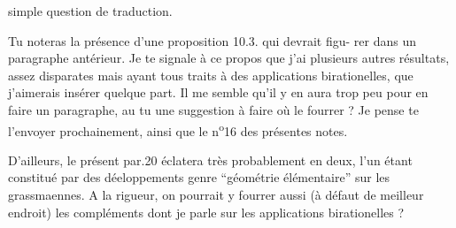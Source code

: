 
simple question de traduction.

Tu noteras la présence d'une proposition 10.3. qui devrait figu-%
rer dans un paragraphe antérieur. Je te signale à ce propos que j'ai
plusieurs autres résultats, assez disparates mais ayant tous traits à
des applications birationelles, que j'aimerais insérer quelque part.
Il me semble qu'il y en aura trop peu pour en faire un paragraphe, au
tu une suggestion à faire où le fourrer ? Je pense te l'envoyer
prochainement, ainsi que le n\textsuperscript{o}16 des présentes notes.

D'ailleurs, le présent par.20 éclatera très probablement en
deux, l'un étant constitué par des déeloppements genre ``géométrie
élémentaire'' sur les grassmaennes. A la rigueur, on pourrait y fourrer
aussi (à défaut de meilleur endroit) les compléments dont je parle sur
les applications birationelles ?

